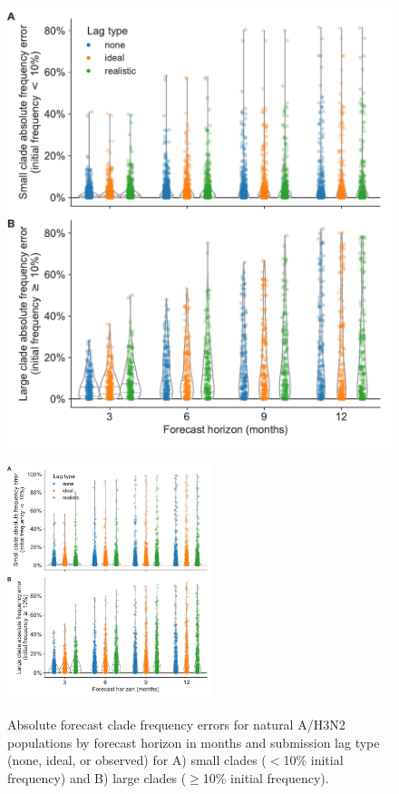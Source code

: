 \documentclass[9pt,lineno]{elife}
\begin{document}
\begin{figure}[htb!]
\includegraphics[width=\linewidth]{figures/h3n2_absolute_forecast_frequency_errors_by_delay_and_horizon}
\caption{Absolute forecast clade frequency errors for natural A/H3N2 populations by forecast horizon in months and submission lag type (none, ideal, or observed) for A) small clades ($<$10\% initial frequency) and B) large clades ($\ge$10\% initial frequency).
}
\label{fig:h3n2_absolute_forecast_clade_frequency_errors}
%
{\includegraphics[width=6cm]{figures/simulated_absolute_forecast_frequency_errors_by_delay_and_horizon}}\label{figsupp:simulated_absolute_forecast_clade_frequency_errors}

\end{figure}
\end{document}
